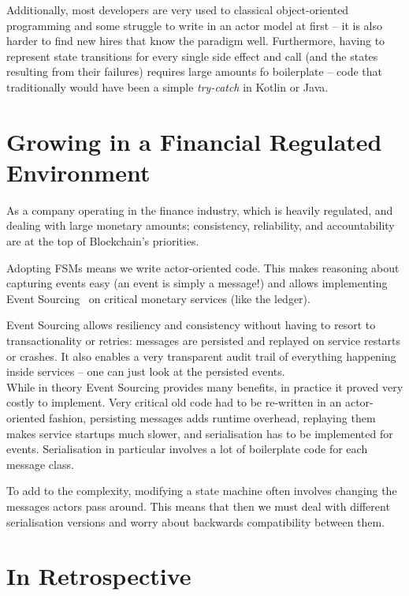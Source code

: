 \documentclass[conference]{IEEEtran}
\begin{document}
    Additionally, most developers are very used to classical object-oriented programming and some
    struggle to write in an actor model at first -- it is also harder to find new hires that know the
    paradigm well.
    Furthermore, having to represent state transitions for every single side effect and call (and the
    states resulting from their failures) requires large amounts fo boilerplate -- code that
    traditionally would have been a simple \emph{try-catch} in Kotlin or Java.

    \section{Growing in a Financial Regulated Environment}\label{sec:regulated}

    As a company operating in the finance industry, which is heavily regulated, and dealing
    with large monetary amounts;
    consistency, reliability, and accountability are at the top of Blockchain's priorities.

    Adopting FSMs means we write actor-oriented code.
    This makes reasoning about capturing events easy (an event is simply a message!) and allows
    implementing Event Sourcing~\cite{fowlerES} on critical monetary services (like the ledger).

    Event Sourcing allows resiliency and consistency without having to resort to transactionality
    or retries: messages are persisted and replayed on service restarts or crashes.
    It also enables a very transparent audit trail of everything happening inside services -- one
    can just look at the persisted events.\\

    While in theory Event Sourcing provides many benefits, in practice it proved very costly to
    implement.
    Very critical old code had to be re-written in an actor-oriented fashion, persisting messages
    adds runtime overhead, replaying them makes service startups much slower, and serialisation has
    to be implemented for events.
    Serialisation in particular involves a lot of boilerplate code for each message class.

    To add to the complexity, modifying a state machine often involves changing the messages actors
    pass around.
    This means that then we must deal with different serialisation versions and worry about
    backwards compatibility between them.

    \section{In Retrospective}

    \printbibliography
\end{document}
